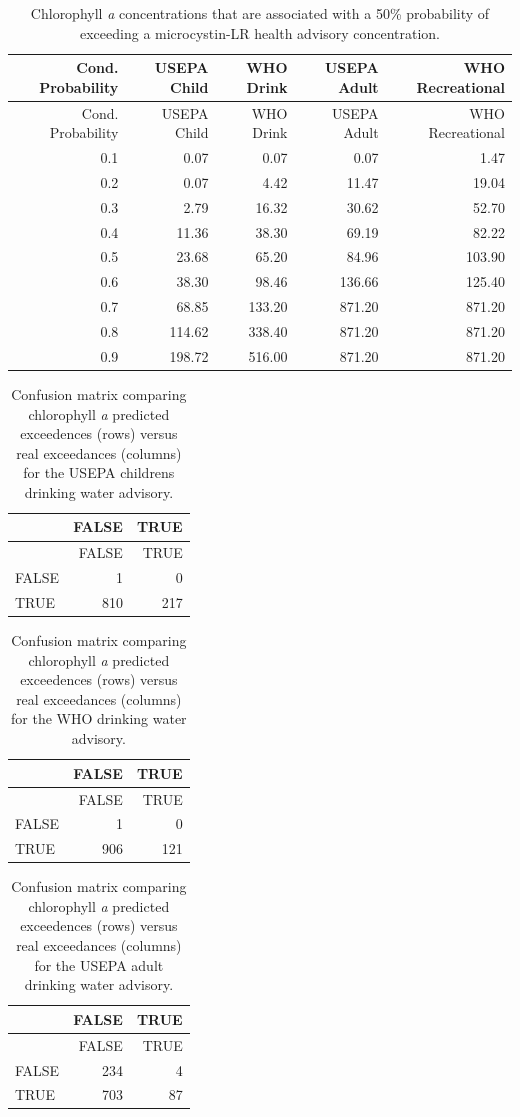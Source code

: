\documentclass[11pt,]{article}
\begin{document}
\newpage

\begin{longtable}[c]{@{}rrrrr@{}}
\caption{Chlorophyll \textit{a} concentrations that are associated with
a 50\% probability of exceeding a microcystin-LR health advisory
concentration. \label{tab:mc_chla_table}}\tabularnewline
\toprule
Cond. Probability & USEPA Child & WHO Drink & USEPA Adult & WHO
Recreational\tabularnewline
\midrule
\endfirsthead
\toprule
Cond. Probability & USEPA Child & WHO Drink & USEPA Adult & WHO
Recreational\tabularnewline
\midrule
\endhead
0.1 & 0.07 & 0.07 & 0.07 & 1.47\tabularnewline
0.2 & 0.07 & 4.42 & 11.47 & 19.04\tabularnewline
0.3 & 2.79 & 16.32 & 30.62 & 52.70\tabularnewline
0.4 & 11.36 & 38.30 & 69.19 & 82.22\tabularnewline
0.5 & 23.68 & 65.20 & 84.96 & 103.90\tabularnewline
0.6 & 38.30 & 98.46 & 136.66 & 125.40\tabularnewline
0.7 & 68.85 & 133.20 & 871.20 & 871.20\tabularnewline
0.8 & 114.62 & 338.40 & 871.20 & 871.20\tabularnewline
0.9 & 198.72 & 516.00 & 871.20 & 871.20\tabularnewline
\bottomrule
\end{longtable}

\newpage

\begin{longtable}[c]{@{}lrr@{}}
\caption{Confusion matrix comparing chlorophyll \textit{a} predicted
exceedences (rows) versus real exceedances (columns) for the USEPA
childrens drinking water advisory.
\label{tab:child_conmat_table}}\tabularnewline
\toprule
& FALSE & TRUE\tabularnewline
\midrule
\endfirsthead
\toprule
& FALSE & TRUE\tabularnewline
\midrule
\endhead
FALSE & 1 & 0\tabularnewline
TRUE & 810 & 217\tabularnewline
\bottomrule
\end{longtable}

\newpage

\begin{longtable}[c]{@{}lrr@{}}
\caption{Confusion matrix comparing chlorophyll \textit{a} predicted
exceedences (rows) versus real exceedances (columns) for the WHO
drinking water advisory.
\label{tab:who_drink_conmat_table}}\tabularnewline
\toprule
& FALSE & TRUE\tabularnewline
\midrule
\endfirsthead
\toprule
& FALSE & TRUE\tabularnewline
\midrule
\endhead
FALSE & 1 & 0\tabularnewline
TRUE & 906 & 121\tabularnewline
\bottomrule
\end{longtable}

\newpage

\begin{longtable}[c]{@{}lrr@{}}
\caption{Confusion matrix comparing chlorophyll \textit{a} predicted
exceedences (rows) versus real exceedances (columns) for the USEPA adult
drinking water advisory. \label{tab:adult_conmat_table}}\tabularnewline
\toprule
& FALSE & TRUE\tabularnewline
\midrule
\endfirsthead
\toprule
& FALSE & TRUE\tabularnewline
\midrule
\endhead
FALSE & 234 & 4\tabularnewline
TRUE & 703 & 87\tabularnewline
\bottomrule
\end{longtable}
\end{document}
